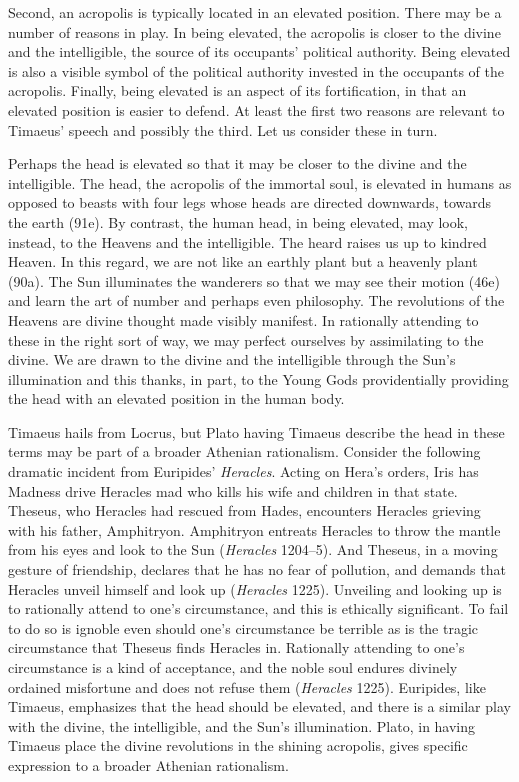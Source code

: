 Second, an acropolis is typically located in an elevated position. There may be a number of reasons in play. In being elevated, the acropolis is closer to the divine and the intelligible, the source of its occupants' political authority. Being elevated is also a visible symbol of the political authority invested in the occupants of the acropolis. Finally, being elevated is an aspect of its fortification, in that an elevated position is easier to defend. At least the first two reasons are relevant to Timaeus' speech and possibly the third. Let us consider these in turn.

Perhaps the head is elevated so that it may be closer to the divine and the intelligible. The head, the acropolis of the immortal soul, is elevated in humans as opposed to beasts with four legs whose heads are directed downwards, towards the earth (91e). By contrast, the human head, in being elevated, may look, instead, to the Heavens and the intelligible. The heard raises us up to kindred Heaven. In this regard, we are not like an earthly plant but a heavenly plant (90a). The Sun illuminates the wanderers so that we may see their motion (46e) and learn the art of number and perhaps even philosophy. The revolutions of the Heavens are divine thought made visibly manifest. In rationally attending to these in the right sort of way, we may perfect ourselves by assimilating to the divine. We are drawn to the divine and the intelligible through the Sun's illumination and this thanks, in part, to the Young Gods providentially providing the head with an elevated position in the human body. 

Timaeus hails from Locrus, but Plato having Timaeus describe the head in these terms may be part of a broader Athenian rationalism. Consider the following dramatic incident from Euripides' \emph{Heracles}. Acting on Hera's orders, Iris has Madness drive Heracles mad who kills his wife and children in that state. Theseus, who Heracles had rescued from Hades, encounters Heracles grieving with his father, Amphitryon. Amphitryon entreats Heracles to throw the mantle from his eyes and look to the Sun (\emph{Heracles} 1204--5). And Theseus, in a moving gesture of friendship, declares that he has no fear of pollution, and demands that Heracles unveil himself and look up (\emph{Heracles} 1225). Unveiling and looking up is to rationally attend to one's circumstance, and this is ethically significant. To fail to do so is ignoble even should one's circumstance be terrible as is the tragic circumstance that Theseus finds Heracles in. Rationally attending to one's circumstance is a kind of acceptance, and the noble soul endures divinely ordained misfortune and does not refuse them (\emph{Heracles} 1225). Euripides, like Timaeus, emphasizes that the head should be elevated, and there is a similar play with the divine, the intelligible, and the Sun's illumination. Plato, in having Timaeus place the divine revolutions in the shining acropolis, gives specific expression to a broader Athenian rationalism.

